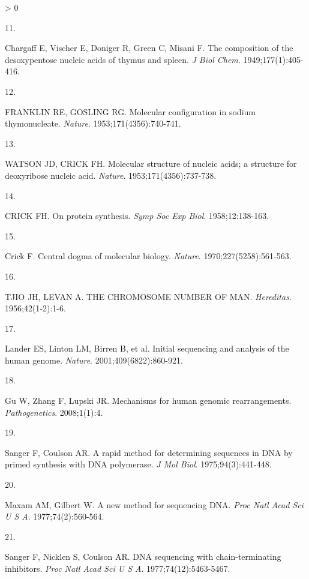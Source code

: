 \documentclass[11pt,letterpaper,oneside]{book}
\newlength{\cslhangindent}
\newlength{\csllabelwidth}
\newenvironment{CSLReferences}[3] %
 {%
  \setlength{\parindent}{0pt}
  \ifodd #1 \everypar{\setlength{\hangindent}{\cslhangindent}}\ignorespaces\fi
  \ifnum #2 > 0
  \setlength{\parskip}{#2\baselineskip}
  \fi
 }%
 {}
\newcommand{\CSLLeftMargin}[1]{\parbox[t]{\maxof{\widthof{#1}}{\csllabelwidth}}{#1}}
\newcommand{\CSLRightInline}[1]{\parbox[t]{\linewidth-\csllabelwidth}{#1}\newline}
\begin{document}
\begin{CSLReferences}{0}{0}
\leavevmode\hypertarget{ref-chargaff:1949aa}{}%
\CSLLeftMargin{11. }
\CSLRightInline{Chargaff E, Vischer E, Doniger R, Green C, Misani F. The composition of the desoxypentose nucleic acids of thymus and spleen. \emph{J Biol Chem}. 1949;177(1):405-416.}

\leavevmode\hypertarget{ref-franklin:1953aa}{}%
\CSLLeftMargin{12. }
\CSLRightInline{FRANKLIN RE, GOSLING RG. Molecular configuration in sodium thymonucleate. \emph{Nature}. 1953;171(4356):740-741.}

\leavevmode\hypertarget{ref-watson:1953aa}{}%
\CSLLeftMargin{13. }
\CSLRightInline{WATSON JD, CRICK FH. Molecular structure of nucleic acids; a structure for deoxyribose nucleic acid. \emph{Nature}. 1953;171(4356):737-738.}

\leavevmode\hypertarget{ref-crick:1958aa}{}%
\CSLLeftMargin{14. }
\CSLRightInline{CRICK FH. On protein synthesis. \emph{Symp Soc Exp Biol}. 1958;12:138-163.}

\leavevmode\hypertarget{ref-crick:1970aa}{}%
\CSLLeftMargin{15. }
\CSLRightInline{Crick F. Central dogma of molecular biology. \emph{Nature}. 1970;227(5258):561-563.}

\leavevmode\hypertarget{ref-tjio:1956aa}{}%
\CSLLeftMargin{16. }
\CSLRightInline{TJIO JH, LEVAN A. THE CHROMOSOME NUMBER OF MAN. \emph{Hereditas}. 1956;42(1‐2):1-6.}

\leavevmode\hypertarget{ref-lander:2001aa}{}%
\CSLLeftMargin{17. }
\CSLRightInline{Lander ES, Linton LM, Birren B, et al. Initial sequencing and analysis of the human genome. \emph{Nature}. 2001;409(6822):860-921.}

\leavevmode\hypertarget{ref-gu:2008aa}{}%
\CSLLeftMargin{18. }
\CSLRightInline{Gu W, Zhang F, Lupski JR. Mechanisms for human genomic rearrangements. \emph{Pathogenetics}. 2008;1(1):4.}

\leavevmode\hypertarget{ref-sanger:1975aa}{}%
\CSLLeftMargin{19. }
\CSLRightInline{Sanger F, Coulson AR. A rapid method for determining sequences in DNA by primed synthesis with DNA polymerase. \emph{J Mol Biol}. 1975;94(3):441-448.}

\leavevmode\hypertarget{ref-maxam:1977aa}{}%
\CSLLeftMargin{20. }
\CSLRightInline{Maxam AM, Gilbert W. A new method for sequencing DNA. \emph{Proc Natl Acad Sci U S A}. 1977;74(2):560-564.}

\leavevmode\hypertarget{ref-sanger:1977aa}{}%
\CSLLeftMargin{21. }
\CSLRightInline{Sanger F, Nicklen S, Coulson AR. DNA sequencing with chain-terminating inhibitors. \emph{Proc Natl Acad Sci U S A}. 1977;74(12):5463-5467.}


\end{CSLReferences}
\end{document}
